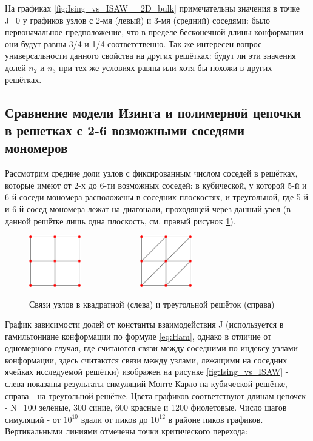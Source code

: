 На графиках \ref{fig:Ising_vs_ISAW__2D_bulk} примечательны значения в точке J=0 у графиков узлов с 2-мя (левый) и 3-мя (средний) соседями: было первоначальное предположение, что в пределе бесконечной длины конформации они будут равны 3/4 и 1/4 соответственно. Так же интересен вопрос универсальности данного свойства на других решётках: будут ли эти значения долей $n_{2}$ и $n_{3}$ при тех же условиях равны или хотя бы похожи в других решётках. 

\subsection{Сравнение модели Изинга и полимерной цепочки в решетках с 2-6 возможными соседями мономеров}

Рассмотрим средние доли узлов с фиксированным числом соседей в решётках, которые имеют от 2-х до 6-ти возможных соседей: в кубической, у которой 5-й и 6-й соседи мономера расположены в соседних плоскостях, и треугольной, где 5-й и 6-й сосед мономера лежат на диагонали, проходящей через данный узел (в данной решётке лишь одна плоскость, см. правый рисунок \ref{fig:lattices}).

\begin{figure}
    \centering
    \includegraphics[width=0.2\textwidth]{Sections/Images/SqLattice.png}\ \ \ \ \ \ \ \ \ \ \ \ \ \ 
    \includegraphics[width=0.2\textwidth]{Sections/Images/TriLattice.png}
    \caption{Связи узлов в квадратной (слева) и треугольной решёток (справа)}
    \label{fig:lattices}
\end{figure}

График зависимости долей от константы взаимодействия J (используется в гамильтониане конформации по формуле \ref{eq:Ham}, однако в отличие от одномерного случая, где считаются связи между соседними по индексу узлами конформации, здесь считаются связи между узлами, лежащими на соседних ячейках исследуемой решётки) изображен на рисунке \ref{fig:Ising_vs_ISAW} - слева показаны результаты симуляций Монте-Карло на кубической решётке, справа - на треугольной решётке. Цвета графиков соответствуют длинам цепочек - N=100 зелёные, 300 синие, 600 красные и 1200 фиолетовые. Число шагов симуляций - от $10^{10}$ вдали от пиков до $10^{12}$ в районе пиков графиков. Вертикальными линиями отмечены точки критического перехода: 


